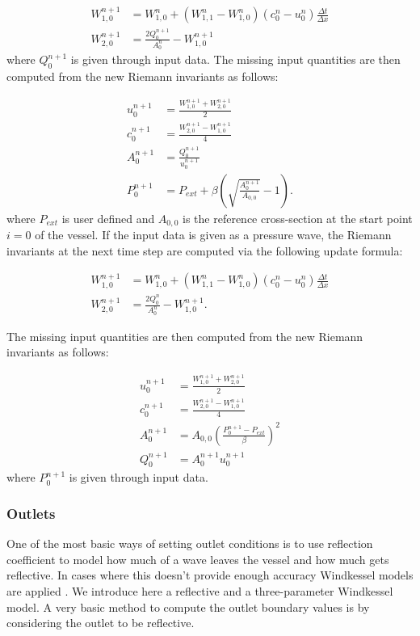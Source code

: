 \documentclass[a4paper, oneside]{discothesis}
\begin{document}
	\begin{align}
		W_{1,0}^{n+1} &= W^n_{1,0} + (W^n_{1,1} - W^n_{1,0})(c^n_0-u^n_0) \frac{\Delta t}{\Delta x} \label{update1a}\\
		W_{2,0}^{n+1} &= \frac{2Q^{n+1}_0}{A^n_0} - W^{n+1}_{1,0} \label{update2a}
	\end{align}
	where $Q^{n+1}_0$ is given through input data.
	The missing input quantities are then computed from the new Riemann invariants as follows:

	\begin{align}
		u_0^{n+1} &= \frac{W_{1,0}^{n+1} + W_{2,0}^{n+1}}{2} \\
		c_0^{n+1} &= \frac{W_{2,0}^{n+1} - W_{1,0}^{n+1}}{4} \\
		A_0^{n+1} &= \frac{Q_0^{n+1}}{u_0^{n+1}} \\
		P_0^{n+1} &= P_{ext} + \beta \left( \sqrt{\frac{A_0^{n+1}}{A_{0,0}}} - 1 \right). 
	\end{align}
	where $P_{ext}$ is user defined and $A_{0,0}$ is the reference cross-section at the start point $i=0$ of the vessel.
	If the input data is given as a pressure wave, the Riemann invariants at the next time step are computed via the following update formula:

	\begin{align}
		W_{1,0}^{n+1} &= W^n_{1,0} + (W^n_{1,1} - W^n_{1,0})(c^n_0-u^n_0) \frac{\Delta t}{\Delta x} \label{update1b}\\
		W_{2,0}^{n+1} &= \frac{2Q^{n}_0}{A^n_0} - W^{n+1}_{1,0} \label{update2b}.
	\end{align}

	The missing input quantities are then computed from the new Riemann invariants as follows:

	\begin{align}
		u_0^{n+1} &= \frac{W_{1,0}^{n+1} + W_{2,0}^{n+1}}{2} \\
		c_0^{n+1} &= \frac{W_{2,0}^{n+1} - W_{1,0}^{n+1}}{4} \\
		A_0^{n+1} &= A_{0,0}\left(\frac{P_0^{n+1}-P_{ext}}{\beta}\right)^2\\
		Q_0^{n+1} &= A_0^{n+1} u_0^{n+1}
	\end{align}
	where $P^{n+1}_0$ is given through input data.

	\subsubsection{Outlets} \label{sssec:outl}
	One of the most basic ways of setting outlet conditions is to use reflection coefficient to model how much of a wave leaves the vessel and how much gets reflective.
	In cases where this doesn't provide enough accuracy Windkessel models are applied \cite {formaggia2010cardiovascular}.
	We introduce here a reflective and a three-parameter Windkessel model.
	A very basic method to compute the outlet boundary values is by considering the outlet to be reflective.
\end{document}
